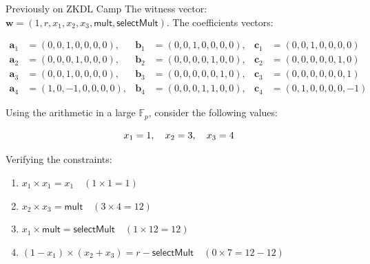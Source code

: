 \documentclass{zkdl-presentation-template}
\begin{document}
    \begin{frame}[fragile]{Previously on ZKDL Camp}
        The witness vector: $\boldsymbol{w} = (1, r, x_1, x_2, x_3, \mathsf{mult}, \mathsf{selectMult})$.
        \pause The coefficients vectors:

        \vspace{-20pt}\small

        \begin{align*}
            \boldsymbol{a}_1 &= (0, 0, 1, 0, 0, 0, 0), & \boldsymbol{b}_1 &= (0, 0, 1, 0, 0, 0, 0), & \boldsymbol{c}_1 &= (0, 0, 1, 0, 0, 0, 0) \\
            \boldsymbol{a}_2 &= (0, 0, 0, 1, 0, 0, 0), & \boldsymbol{b}_2 &= (0, 0, 0, 0, 1, 0, 0), & \boldsymbol{c}_2 &= (0, 0, 0, 0, 0, 1, 0) \\
            \boldsymbol{a}_3 &= (0, 0, 1, 0, 0, 0, 0), & \boldsymbol{b}_3 &= (0, 0, 0, 0, 0, 1, 0), & \boldsymbol{c}_3 &= (0, 0, 0, 0, 0, 0, 1) \\
            \boldsymbol{a}_4 &= (1, 0, -1, 0, 0, 0, 0), & \boldsymbol{b}_4 &= (0, 0, 0, 1, 1, 0, 0), & \boldsymbol{c}_4 &= (0, 1, 0, 0, 0, 0, -1)
        \end{align*}\normalsize

        \pause \vspace{-10pt}

        Using the arithmetic in a large $\mathbb{F}_p$, consider the following values:

        \vspace{-15pt}
        \begin{equation*}
            x_1 = 1, \quad x_2 = 3, \quad x_3 = 4
            \vspace{-5pt}
        \end{equation*}

        Verifying the constraints:
        \begin{enumerate}
            \item \( x_1 \times x_1 = x_1 \quad (1 \times 1 = 1) \)
            \item \( x_2 \times x_3 = \mathsf{mult} \quad (3 \times 4 = 12) \)
            \item \( x_1 \times \mathsf{mult} = \mathsf{selectMult} \quad (1 \times 12 = 12) \)
            \item \( (1 - x_1) \times (x_2 + x_3) = r - \mathsf{selectMult} \quad (0 \times 7 = 12 - 12) \)
        \end{enumerate}
    \end{frame}
\end{document}
